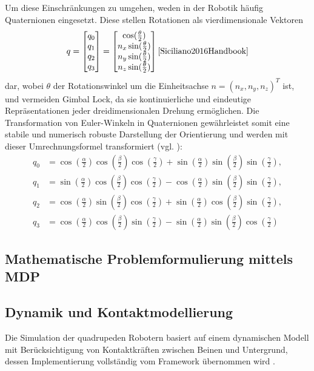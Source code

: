 Um diese Einschränkungen zu umgehen, weden in der Robotik häufig Quaternionen eingesetzt. Diese stellen Rotationen als vierdimensionale Vektoren 
\begin{equation}
	q = \begin{bmatrix}
		q_0 \\
		q_1 \\
		q_2 \\
		q_3
	\end{bmatrix} = \begin{bmatrix}
	\cos(\frac{\theta}{2}) \\
	n_x\sin(\frac{\theta}{2}) \\
	n_y\sin(\frac{\theta}{2}) \\
	n_z\sin(\frac{\theta}{2})
	\end{bmatrix} \text{\cite{Siciliano2016Handbook}}
\end{equation}
dar, wobei $\theta$ der Rotationswinkel um die Einheitsachse $n = (n_x, n_y, n_z)^T$ ist, und vermeiden Gimbal Lock, da sie kontinuierliche und eindeutige Repräsentationen jeder dreidimensionalen Drehung ermöglichen. Die Transformation von Euler-Winkeln in Quaternionen gewährleistet somit eine stabile und numerisch robuste Darstellung der Orientierung und werden mit dieser Umrechnungsformel transformiert (vgl. \cite{Diebel2006}):
\begin{equation}
\begin{aligned}
	q_0 &= \cos(\frac{\alpha}{2})\cos(\frac{\beta}{2})\cos(\frac{\gamma}{2}) + \sin(\frac{\alpha}{2})\sin(\frac{\beta}{2})\sin(\frac{\gamma}{2}), \\
	q_1 &= \sin(\frac{\alpha}{2})\cos(\frac{\beta}{2})\cos(\frac{\gamma}{2}) - \cos(\frac{\alpha}{2})\sin(\frac{\beta}{2})\sin(\frac{\gamma}{2}), \\
	q_2 &= \cos(\frac{\alpha}{2})\sin(\frac{\beta}{2})\cos(\frac{\gamma}{2}) + \sin(\frac{\alpha}{2})\cos(\frac{\beta}{2})\sin(\frac{\gamma}{2}), \\
	q_3 &= \cos(\frac{\alpha}{2})\cos(\frac{\beta}{2})\sin(\frac{\gamma}{2}) - \sin(\frac{\alpha}{2})\sin(\frac{\beta}{2})\cos(\frac{\gamma}{2})
\end{aligned}
\end{equation}
\subsection{Mathematische Problemformulierung mittels MDP}

\subsection{Dynamik und Kontaktmodellierung}
Die Simulation der quadrupeden Robotern basiert auf einem dynamischen Modell mit Berücksichtigung von Kontaktkräften zwischen Beinen und Untergrund, dessen Implementierung vollständig vom Framework übernommen wird \cite{authorsGenesisGenerativeUniversal2024}.
